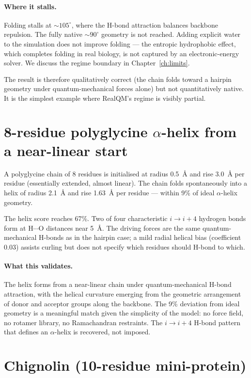 \paragraph{Where it stalls.} Folding stalls at $\sim 105^\circ$, where the H-bond attraction balances backbone repulsion. The fully native $\sim 90^\circ$ geometry is not reached. Adding explicit water to the simulation does not improve folding --- the entropic hydrophobic effect, which completes folding in real biology, is not captured by an electronic-energy solver. We discuss the regime boundary in Chapter~\ref{ch:limits}.

The result is therefore qualitatively correct (the chain folds toward a hairpin geometry under quantum-mechanical forces alone) but not quantitatively native. It is the simplest example where RealQM's regime is visibly partial.

\section{8-residue polyglycine $\alpha$-helix from a near-linear start}\label{sec:helix}

A polyglycine chain of 8 residues is initialised at radius 0.5~\AA{} and rise 3.0~\AA{} per residue (essentially extended, almost linear). The chain folds spontaneously into a helix of radius 2.1~\AA{} and rise 1.63~\AA{} per residue --- within 9\% of ideal $\alpha$-helix geometry.

The helix score reaches 67\%. Two of four characteristic $i \to i{+}4$ hydrogen bonds form at H$\cdots$O distances near 5~\AA. The driving forces are the same quantum-mechanical H-bonds as in the hairpin case; a mild radial helical bias (coefficient 0.03) assists curling but does not specify which residues should H-bond to which.

\paragraph{What this validates.} The helix forms from a near-linear chain under quantum-mechanical H-bond attraction, with the helical curvature emerging from the geometric arrangement of donor and acceptor groups along the backbone. The 9\% deviation from ideal geometry is a meaningful match given the simplicity of the model: no force field, no rotamer library, no Ramachandran restraints. The $i \to i{+}4$ H-bond pattern that defines an $\alpha$-helix is recovered, not imposed.

\section{Chignolin (10-residue mini-protein)}\label{sec:chignolin}

